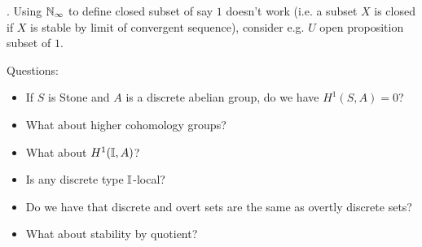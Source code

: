 \begin{remark}
. Using $\mathbb{N}_{\infty}$ to define closed subset of say $1$ doesn't work (i.e. a subset $X$ is closed if $X$ is stable by limit of convergent sequence), consider e.g. $U$ open proposition subset of $1$.
\end{remark}

Questions:
\begin{itemize}
\item If $S$ is Stone and $A$ is a discrete abelian group, do we have $H^1(S,A) = 0$? 
\item What about higher cohomology groups? 
\item What about $H^1(\mathbb{I},A)$? 
\item Is any discrete type $\mathbb{I}$-local? 
\item Do we have that discrete and overt sets are the same as overtly discrete sets?
\item What about stability by quotient?
\end{itemize}